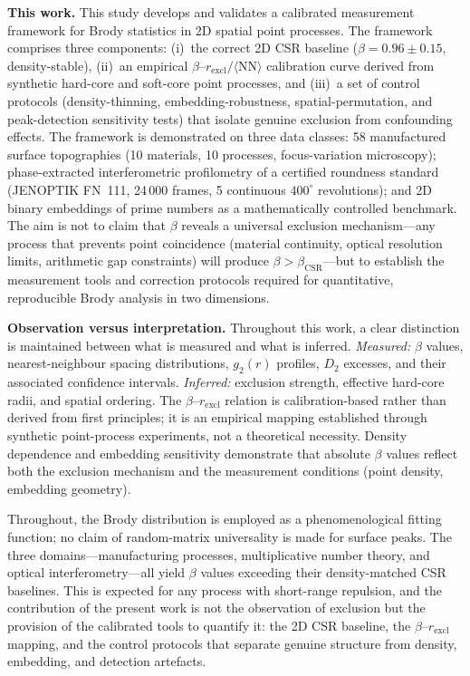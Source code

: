\documentclass[final,3p,times,twocolumn]{elsarticle}
\theoremstyle{definition}
\begin{document}
\textbf{This work.} This study develops and validates a calibrated
measurement framework for Brody statistics in 2D spatial point
processes. The framework comprises three components: (i)~the correct
2D CSR baseline ($\beta=0.96\pm0.15$, density-stable),
(ii)~an empirical $\beta$--$r_{\text{excl}}/\langle\text{NN}\rangle$
calibration curve derived from synthetic hard-core and soft-core
point processes, and (iii)~a set of control protocols
(density-thinning, embedding-robustness, spatial-permutation,
and peak-detection sensitivity tests) that isolate genuine exclusion
from confounding effects. The framework is demonstrated on three
data classes: 58 manufactured surface topographies (10 materials,
10 processes, focus-variation microscopy); phase-extracted
interferometric profilometry of a certified roundness standard
(JENOPTIK FN~111, 24\,000 frames, 5 continuous $400^\circ$
revolutions); and 2D binary embeddings of prime numbers as a
mathematically controlled benchmark. The aim is not to claim that
$\beta$ reveals a universal exclusion mechanism---any process that
prevents point coincidence (material continuity, optical resolution
limits, arithmetic gap constraints) will produce $\beta>\beta_{\text{CSR}}$---but
to establish the measurement tools and correction protocols required
for quantitative, reproducible Brody analysis in two dimensions.

\textbf{Observation versus interpretation.} Throughout this work, a
clear distinction is maintained between what is measured and what is
inferred. \emph{Measured:} $\beta$ values, nearest-neighbour spacing
distributions, $g_2(r)$ profiles, $D_2$ excesses, and their associated
confidence intervals. \emph{Inferred:} exclusion strength, effective
hard-core radii, and spatial ordering. The $\beta$--$r_{\text{excl}}$
relation is calibration-based rather than derived from first
principles; it is an empirical mapping established through synthetic
point-process experiments, not a theoretical necessity. Density
dependence and embedding sensitivity demonstrate that absolute
$\beta$ values reflect both the exclusion mechanism and the
measurement conditions (point density, embedding geometry).

Throughout, the Brody distribution is employed as a phenomenological
fitting function; no claim of random-matrix universality is made for
surface peaks. The three domains---manufacturing processes,
multiplicative number theory, and optical interferometry---all yield
$\beta$ values exceeding their density-matched CSR baselines. This is
expected for any process with short-range repulsion, and the
contribution of the present work is not the observation of exclusion
but the provision of the calibrated tools to quantify it:
the 2D CSR baseline, the $\beta$--$r_{\text{excl}}$ mapping, and
the control protocols that separate genuine structure from
density, embedding, and detection artefacts.
\end{document}
